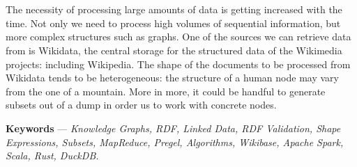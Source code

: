 \newenvironment{abstract}%
{\cleardoublepage\null\vfill\section*{\abstractname}}%
{\vfill\null}
\begin{abstract}
    The necessity of processing large amounts of data is getting increased with the time. Not only we need to process high volumes of sequential information, but more complex structures such as graphs. One of the sources we can retrieve data from is Wikidata, the central storage for the structured data of the Wikimedia projects: including Wikipedia. The shape of the documents to be processed from Wikidata tends to be heterogeneous: the structure of a human node may vary from the one of a mountain. More in more, it could be handful to generate subsets out of a dump in order us to work with concrete nodes.
\end{abstract}

\noindent \textbf{Keywords} --- \textit{Knowledge Graphs, RDF, Linked Data, RDF Validation, Shape Expressions, Subsets, MapReduce, Pregel, Algorithms, Wikibase, Apache Spark, Scala, Rust, DuckDB.}